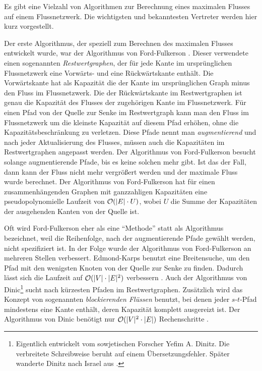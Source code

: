 Es gibt eine Vielzahl von Algorithmen zur Berechnung eines maximalen Flusses auf einem Flussnetzwerk. Die wichtigsten und bekanntesten Vertreter werden hier kurz vorgestellt. 

Der erste Algorithmus, der speziell zum Berechnen des maximalen Flusses entwickelt wurde, war der Algorithmus von Ford-Fulkerson \cite{ff56}. Dieser verwendete einen sogenannten \emph{Restwertgraphen}, der für jede Kante im ursprünglichen Flussnetzwerk eine Vorwärts- und eine Rückwärtskante enthält. Die Vorwärtskante hat als Kapazität die der Kante im ursprünglichen Graph minus den Fluss im Flussnetzwerk. Die der Rückwärtskante im Restwertgraphen ist genau die Kapazität des Flusses der zugehörigen Kante im Flussnetzwerk. Für einen Pfad von der Quelle zur Senke im Restwertgraph kann man den Fluss im Flussnetzwerk um die kleinste Kapazität auf diesem Pfad erhöhen, ohne die Kapazitätsbeschränkung zu verletzen. Diese Pfade nennt man \emph{augmentierend} und nach jeder Aktualisierung des Flusses, müssen auch die Kapazitäten im Restwertgraphen angepasst werden. Der Algorithmus von Ford-Fulkerson besucht solange augmentierende Pfade, bis es keine solchen mehr gibt. Ist das der Fall, dann kann der Fluss nicht mehr vergrößert werden und der maximale Fluss wurde berechnet. Der Algorithmus von Ford-Fulkerson hat für einen zusammenhängenden Graphen mit ganzzahligen Kapazitäten eine pseudopolynomielle Laufzeit von $\mathcal{O}(|E|\cdot U)$, wobei $U$ die Summe der Kapazitäten der ausgehenden Kanten von der Quelle ist.

Oft wird Ford-Fulkerson eher als eine \enquote{Methode} statt als Algorithmus bezeichnet, weil die Reihenfolge, nach der augmentierende Pfade gewählt werden, nicht spezifiziert ist. In der Folge wurde der Algorithmus von Ford-Fulkerson an mehreren Stellen verbessert. Edmond-Karps benutzt eine Breitensuche, um den Pfad mit den wenigsten Knoten von der Quelle zur Senke zu finden. Dadurch lässt sich die Laufzeit auf $\mathcal{O}(|V|\cdot |E|^2)$ verbessern \cite[S.727ff.]{clrs09}. Auch der Algorithmus von Dinic\footnote{Eigentlich entwickelt vom sowjetischen Forscher Yefim A. Dinitz. Die verbreitete Schreibweise beruht auf einem Übersetzungsfehler. Später wanderte Dinitz nach Israel aus \cite{d06}.} sucht nach kürzesten Pfaden im Restwertgraphen. Zusätzlich wird das Konzept von sogenannten \emph{blockierenden Flüssen} benutzt, bei denen jeder $s$-$t$-Pfad mindestens eine Kante enthält, deren Kapazität komplett ausgereizt ist. Der Algorithmus von Dinic benötigt nur $\mathcal{O}(|V|^2\cdot |E|)$ Rechenschritte \cite{d06}.

